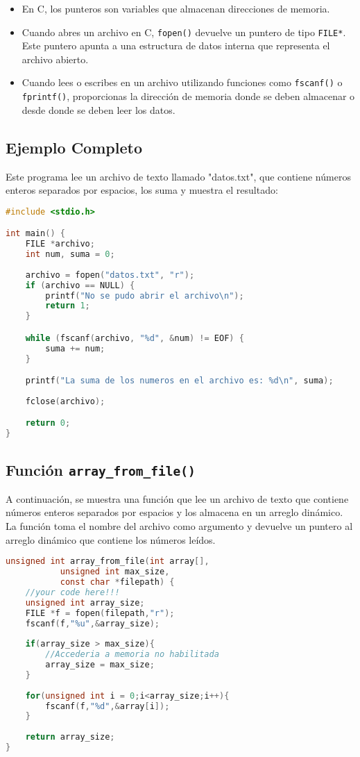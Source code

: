 \begin{itemize}
    \item En C, los punteros son variables que almacenan direcciones de memoria.
    \item Cuando abres un archivo en C, \texttt{fopen()} devuelve un puntero de tipo \texttt{FILE*}. Este puntero apunta a una estructura de datos interna que representa el archivo abierto.
    \item Cuando lees o escribes en un archivo utilizando funciones como \texttt{fscanf()} o \texttt{fprintf()}, proporcionas la dirección de memoria donde se deben almacenar o desde donde se deben leer los datos.
\end{itemize}

\subsection{Ejemplo Completo}

Este programa lee un archivo de texto llamado "datos.txt", que contiene números enteros separados por espacios, los suma y muestra el resultado:

\begin{lstlisting}[language=C]
#include <stdio.h>

int main() {
    FILE *archivo;
    int num, suma = 0;
    
    archivo = fopen("datos.txt", "r");
    if (archivo == NULL) {
        printf("No se pudo abrir el archivo\n");
        return 1;
    }

    while (fscanf(archivo, "%d", &num) != EOF) {
        suma += num;
    }

    printf("La suma de los numeros en el archivo es: %d\n", suma);
    
    fclose(archivo);

    return 0;
}
\end{lstlisting}

\subsection{Función \texttt{array\_from\_file()}}

A continuación, se muestra una función que lee un archivo de texto que contiene números enteros separados por espacios y los almacena en un arreglo dinámico. La función toma el nombre del archivo como argumento y devuelve un puntero al arreglo dinámico que contiene los números leídos.

\begin{lstlisting}[language=C]
unsigned int array_from_file(int array[],
           unsigned int max_size,
           const char *filepath) {
    //your code here!!!
	unsigned int array_size;
	FILE *f = fopen(filepath,"r");
	fscanf(f,"%u",&array_size);
	
	if(array_size > max_size){
		//Accederia a memoria no habilitada
		array_size = max_size;
	}
	
	for(unsigned int i = 0;i<array_size;i++){
		fscanf(f,"%d",&array[i]);
	}
	
	return array_size;
}
\end{lstlisting}

